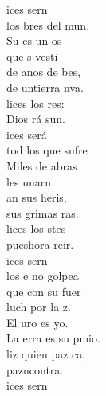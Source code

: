 \documentclass[12pt]{article}
\begin{document}
\begin{multicols*}{2}
        \begin{cancion}%
            ices sern\\
            los bres del mun.\\
            Su  es un os\\
            que s vesti \\
            de anos de bes,\\
            de untierra nva.\\
            lices los res:\\
            Dios rá sun.\\
        \jump
            ices será\\
            tod los que sufre\\
            Miles de abras\\
            les unarn.\\
            an sus heris,\\
            sus grimas ras. \\
            lices los stes\\
            pueshora reir.\\
        \jump
            ices sern\\
            los e no golpea\\
             que con su fuer\\
            luch por la z.\\
            El uro es yo.\\
            La erra es su pmio.\\
            liz quien paz ca,\\
            pazncontra.\\
        \jump
            ices sern\\

\end{cancion}
\end{multicols*}
\end{document}

